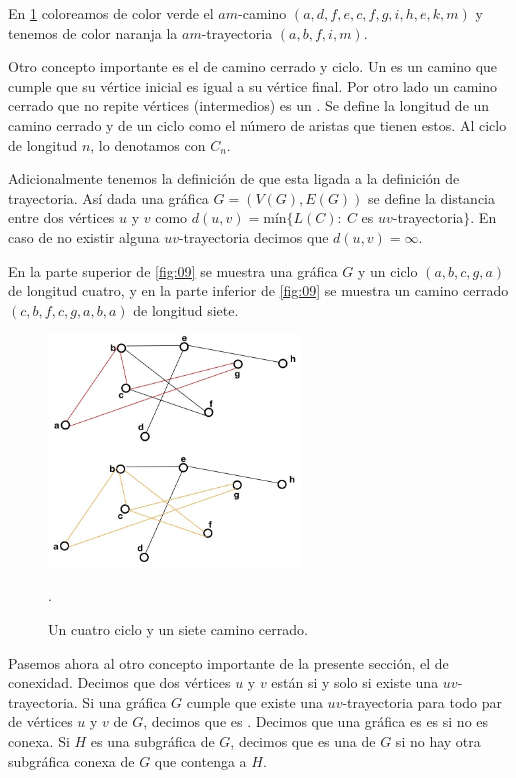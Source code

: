 En \cref{fig:08} coloreamos de color verde el $am$-camino
$(a,d,f,e,c,f,g,i,h,e,k,m)$ y tenemos de color naranja la $am$-trayectoria
$(a,b,f,i,m)$.

Otro concepto importante es el de camino cerrado y ciclo. Un
 es un camino que cumple que su vértice inicial es
igual a su vértice final. Por otro lado un camino cerrado que no repite vértices
(intermedios) es un . Se define la longitud de un camino cerrado y
de un ciclo como el número de aristas que tienen estos. Al ciclo de longitud
$n$, lo denotamos con $C_n$.

Adicionalmente tenemos la definición de  que esta ligada a la
definición de trayectoria. Así dada una gráfica $G=(V(G),E(G))$ se define la
distancia entre dos vértices $u$ y $v$ como $d(u,v)=$m\'in$ \{L(C) \colon\ C$ es
$uv$-trayectoria$ \}$. En caso de no existir alguna $uv$-trayectoria decimos que
$d(u,v)=\infty$. 

En la parte superior de \cref{fig:09} se muestra una gráfica $G$ y un ciclo
$(a,b,c,g,a)$ de longitud cuatro, y en la parte inferior de \cref{fig:09} se
muestra un camino cerrado $(c,b,f,c,g,a,b,a)$ de longitud siete.

\begin{figure}[H]
  \centering
  \includegraphics[width=0.6\textwidth]{recursos/capturas/13.jpg}
  \caption{Un cuatro ciclo y un siete camino cerrado.}.
  \label{fig:08}
\end{figure}

Pasemos ahora al otro concepto importante de la presente sección, el de
conexidad. Decimos que dos vértices  $u$ y $v$ están  si y
solo si existe una $uv$-trayectoria. Si una gráfica $G$ cumple que existe una
$uv$-trayectoria para todo par de vértices $u$ y $v$ de $G$, decimos que es
. Decimos que una gr\'afica es es
 si no es conexa. Si $H$ es una subgráfica de $G$,
decimos que es una  de $G$ si no hay otra subgráfica
conexa de $G$ que contenga a $H$.

